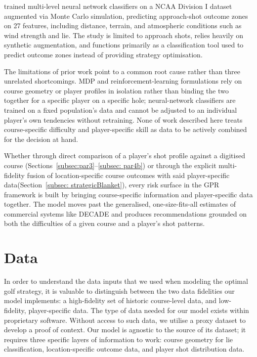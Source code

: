 \documentclass[11pt, letterpaper]{article}
\begin{document}
\textcite{khazaeli_golf_2024} trained multi-level neural network classifiers on a NCAA Division I dataset augmented via Monte Carlo simulation, predicting approach-shot outcome zones on 27 features, including distance, terrain, and atmospheric conditions such as wind strength and lie. The study is limited to approach shots, relies heavily on synthetic augmentation, and functions primarily as a classification tool used to predict outcome zones instead of providing strategy optimisation.

The limitations of prior work point to a common root cause rather than three unrelated shortcomings. MDP and reinforcement-learning formulations \parencite{sugawara_skill-based_2013, stauffer_golf_2025} rely on course geometry or player profiles in isolation rather than binding the two together for a specific player on a specific hole; neural-network classifiers
\parencite{khazaeli_golf_2024} are trained on a fixed population's data and cannot be adjusted to an individual player's own tendencies without retraining. None of work described here treats course-specific difficulty and player-specific skill as data to be actively combined for the decision at hand.

Whether through direct comparison of a player's shot profile against a digitised course (Sections~\ref{subsec:par3}--\ref{subsec: par4b}) or through the explicit multi-fidelity fusion of location-specific course
outcomes with said player-specific data(Section~\ref{subsec: strategicBlanket}), every risk surface in the GPR framework is built by bringing course-specific information and player-specific data together. The model moves past the generalised, one-size-fits-all
estimates of commercial systems like DECADE \parencite{decade_golf} and produces 
recommendations grounded on both the difficulties of a given course and a player's shot patterns.

\section{Data}
\label{sec:Data}

In order to understand the data inputs that we used when modeling the optimal golf strategy, it is valuable to distinguish between the two data fidelities our model implements: a high-fidelity set of historic course-level data, and low-fidelity, player-specific data. The type of data needed for our model exists within proprietary software. Without access to such data, we utilise a proxy dataset to develop a proof of context. Our model is agnostic to the source of its dataset; it requires three specific layers of information to work: course geometry for lie classification, location-specific outcome data, and player shot distribution data.
\end{document}
